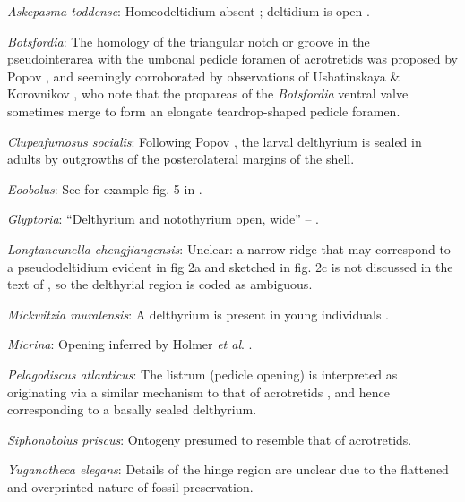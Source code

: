\documentclass[openany]{book}
\theoremstyle{definition}
\theoremstyle{definition}
\theoremstyle{definition}
\theoremstyle{remark}
\begin{document}
\hypertarget{Askepasma_toddense-coding-39}{}
\emph{Askepasma toddense}: Homeodeltidium absent
\citep[p.~153]{Williams2000LinguliformeaCraniiformea}; deltidium is open
\citep[see][fig. 4]{Topper2013Theoldest}.

\hypertarget{Botsfordia-coding-39}{}
\emph{Botsfordia}: The homology of the triangular notch or groove in the
pseudointerarea with the umbonal pedicle foramen of acrotretids was
proposed by Popov \citeyearpar{Popov1992TheCambrian}, and seemingly
corroborated by observations of Ushatinskaya \& Korovnikov
\citeyearpar{Ushatinskaya2016Revisionof}, who note that the propareas of
the \emph{Botsfordia} ventral valve sometimes merge to form an elongate
teardrop-shaped pedicle foramen.

\hypertarget{Clupeafumosus_socialis-coding-39}{}
\emph{Clupeafumosus socialis}: Following Popov
\citeyearpar{Popov1992TheCambrian}, the larval delthyrium is sealed in
adults by outgrowths of the posterolateral margins of the shell.

\hypertarget{Eoobolus-coding-39}{}
\emph{Eoobolus}: See for example fig. 5 in
\citet{Balthasar2009Thebrachiopod}.

\hypertarget{Glyptoria-coding-39}{}
\emph{Glyptoria}: ``Delthyrium and notothyrium open, wide'' --
\citet{Cooper1976LowerCambrian}.

\hypertarget{Longtancunella_chengjiangensis-coding-39}{}
\emph{Longtancunella chengjiangensis}: Unclear: a narrow ridge that may
correspond to a pseudodeltidium evident in fig 2a and sketched in fig.
2c is not discussed in the text of \citet{Zhang2011Theexceptionally}, so
the delthyrial region is coded as ambiguous.

\hypertarget{Mickwitzia_muralensis-coding-39}{}
\emph{Mickwitzia muralensis}: A delthyrium is present in young
individuals \citep{Balthasar2004Shellstructure}.

\hypertarget{Micrina-coding-39}{}
\emph{Micrina}: Opening inferred by Holmer \emph{et al}.
\citeyearpar{Holmer2008TheEarly}.

\hypertarget{Pelagodiscus_atlanticus-coding-39}{}
\emph{Pelagodiscus atlanticus}: The listrum (pedicle opening) is
interpreted as originating via a similar mechanism to that of
acrotretids \citep{Popov1992TheCambrian}, and hence corresponding to a
basally sealed delthyrium.

\hypertarget{Siphonobolus_priscus-coding-39}{}
\emph{Siphonobolus priscus}: Ontogeny presumed to resemble that of
acrotretids.

\hypertarget{Yuganotheca_elegans-coding-39}{}
\emph{Yuganotheca elegans}: Details of the hinge region are unclear due
to the flattened and overprinted nature of fossil preservation.
\end{document}
